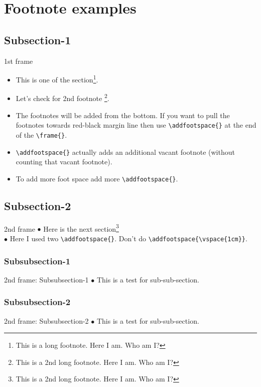 \section{Footnote examples}
\subsection{Subsection-1}
\begin{frame}[fragile]{1st frame}
    \begin{itemize}
        \item This is one of the section\footnote{This is a long footnote. Here I am. Who am I?}. 
        \item Let's check for 2nd footnote \footnote{This is a 2nd long footnote. Here I am. Who am I?}.
        \item The footnotes will be added from the bottom. If you want to pull the footnotes towards red-black margin line then use \verb|\addfootspace{}| at the end of the \verb|\frame{}|.
        \item \verb|\addfootspace{}| actually adds an additional vacant footnote (without counting that vacant footnote).
        \item To add more foot space add more \verb|\addfootspace{}|. 
    \end{itemize}
\addfootspace{} %
\end{frame}
\subsection{Subsection-2}
\begin{frame}[fragile]{2nd frame}
   $\bullet$ Here is the next section\footnote{This is a 2nd long footnote. Here I am. Who am I?}\\
   $\bullet$ Here I used two \verb|\addfootspace{}|. Don't do \verb|\addfootspace{\vspace{1cm}}|.
   \addfootspace{}\addfootspace{}
\end{frame}
\subsubsection{Subsubsection-1}
\begin{frame}{2nd frame: Subsubsection-1}
$\bullet$ This is a test for sub-sub-section.
\end{frame}
\subsubsection{Subsubsection-2}
\begin{frame}{2nd frame: Subsubsection-2}
$\bullet$ This is a test for sub-sub-section.
\end{frame}

